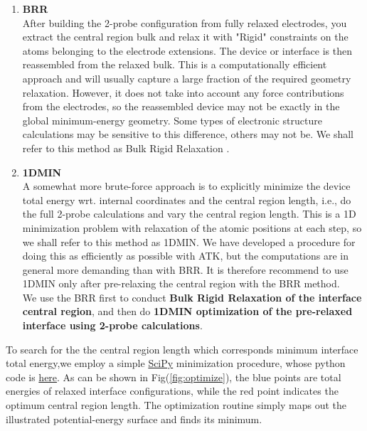 \begin{enumerate}
\item \textbf{BRR}\\
After building the 2-probe configuration from fully relaxed electrodes, you extract the central region bulk and relax it with "Rigid" constraints on the atoms belonging to the electrode extensions. The device or interface is then reassembled from the relaxed bulk. This is a computationally efficient approach and will usually capture a large fraction of the required geometry relaxation. However, it does not take into account any force contributions from the electrodes, so the reassembled device may not be exactly in the global minimum-energy geometry. Some types of electronic structure calculations may be sensitive to this difference, others may not be. We shall refer to this method as Bulk Rigid Relaxation .
\item \textbf{1DMIN}\\
A somewhat more brute-force approach is to explicitly minimize the device total energy wrt. internal coordinates and the central region length, i.e., do the full 2-probe calculations and vary the central region length. This is a 1D minimization problem with relaxation of the atomic positions at each step, so we shall refer to this method as 1DMIN. We have developed a procedure for doing this as efficiently as possible with ATK, but the computations are in general more demanding than with BRR. It is therefore recommend to use 1DMIN only after pre-relaxing the central region with the BRR method. \\
We use the BRR first to conduct \textbf{Bulk Rigid Relaxation of the interface central region}, and then do \textbf{1DMIN optimization of the pre-relaxed interface using 2-probe calculations}.\\

\end{enumerate}

\noindent To search for the the central region length which corresponds minimum interface total energy,we employ a  simple \href{https://docs.scipy.org/doc/scipy-0.13.0/reference/generated/scipy.optimize.minimize_scalar.html#scipy.optimize.minimize_scalar}{SciPy} minimization procedure, whose python code is \href{https://github.com/chieko-feiyuxiao/Oric/tree/master/InterfaceOptimization}{here}.
As can be shown in Fig(\ref{fig:optimize}), the blue points are total energies of relaxed interface configurations, while the red point indicates the optimum central region length. The optimization routine simply maps out the illustrated potential-energy surface and finds its minimum.



